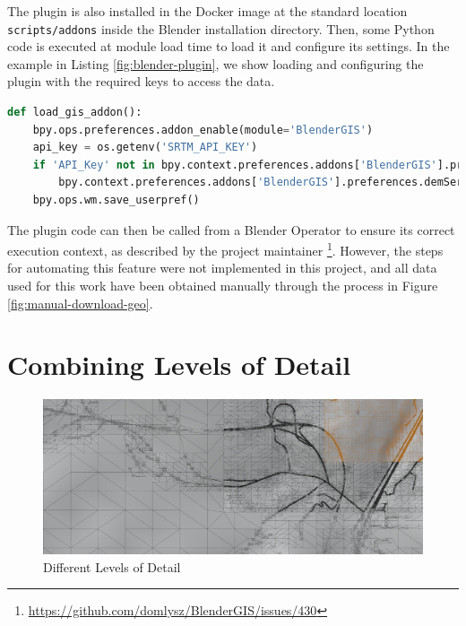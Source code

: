 The plugin is also installed in the Docker image at the standard location \texttt{scripts/addons} inside the Blender installation directory. Then, some Python code is executed at module load time to load it and configure its settings. In the example in Listing \ref{fig:blender-plugin}, we show loading and configuring the plugin with the required keys to access the data.


\begin{lstlisting}[language=python,label={fig:blender-plugin},caption={Activating and Configuring a Blender Plugin}]
def load_gis_addon():                                   
    bpy.ops.preferences.addon_enable(module='BlenderGIS')
    api_key = os.getenv('SRTM_API_KEY')
    if 'API_Key' not in bpy.context.preferences.addons['BlenderGIS'].preferences.demServer:
        bpy.context.preferences.addons['BlenderGIS'].preferences.demServer += f"&API_Key={api_key}"
    bpy.ops.wm.save_userpref() 
\end{lstlisting}


The plugin code can then be called from a Blender Operator to ensure its correct execution context, as described by the project maintainer \footnote{\url{https://github.com/domlysz/BlenderGIS/issues/430}}. However, the steps for automating this feature were not implemented in this project, and all data used for this work have been obtained manually through the process in Figure \ref{fig:manual-download-geo}.

\section{Combining Levels of Detail}
\label{sec:combine-levels-of-detail}

\begin{figure}[H]
    \centering
    \includegraphics[width=14.5cm]{src/img/pic/pic-1 blender screenshot sat levels of detail.jpg}
    \caption{Different Levels of Detail }
    \label{fig:impl-levels-of-detail}
\end{figure}

